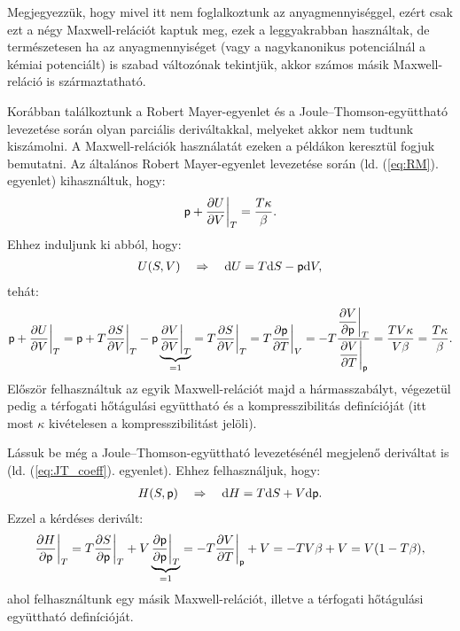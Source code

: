 Megjegyezzük, hogy mivel itt nem foglalkoztunk az anyagmennyiséggel, ezért csak ezt a négy Maxwell-relációt kaptuk meg, ezek a leggyakrabban használtak, de természetesen ha az anyagmennyiséget (vagy a nagykanonikus potenciálnál a kémiai potenciált) is szabad változónak tekintjük, akkor számos másik Maxwell-reláció is származtatható.

Korábban találkoztunk a Robert Mayer-egyenlet és a Joule--Thomson-együttható levezetése során olyan parciális deriváltakkal, melyeket akkor nem tudtunk kiszámolni. A Maxwell-relációk használatát ezeken a példákon keresztül fogjuk bemutatni. Az általános Robert Mayer-egyenlet levezetése során (ld. (\ref{eq:RM}). egyenlet) kihasználtuk, hogy:
\begin{align}
    \mathsf p + \frac{\partial{U}}{\partial{V}}\bigg|_T = \frac{T\kappa}{\beta}.
\end{align}
Ehhez induljunk ki abból, hogy:
\begin{align}
    U(S,V) \quad\Rightarrow\quad \mathrm{d}U=T\mathrm{d}S-\mathsf p\mathrm{d}V,
\end{align}
tehát:
\begin{align}\label{eq:RM_Maxwell}
    \mathsf p + \frac{\partial{U}}{\partial{V}}\bigg|_T = \mathsf p + T\frac{\partial{S}}{\partial{V}}\bigg|_T-\mathsf p\underbrace{\frac{\partial{V}}{\partial{V}}\bigg|_T}_{=1}=T\frac{\partial{S}}{\partial{V}}\bigg|_T=T\frac{\partial{\mathsf p}}{\partial{T}}\bigg|_V = - T \frac{\dfrac{\partial V}{\partial \mathsf p}\bigg|_T}{\dfrac{\partial V}{\partial T}\bigg|_\mathsf p} = \frac{TV\kappa}{V\beta}=\frac{T\kappa}{\beta}.
\end{align}
Először felhasználtuk az egyik Maxwell-relációt majd a hármasszabályt, végezetül pedig a térfogati hőtágulási együttható és a kompresszibilitás definícióját (itt most $\kappa$ kivételesen a kompresszibilitást jelöli).

Lássuk be még a Joule--Thomson-együttható levezetésénél megjelenő deriváltat is (ld. (\ref{eq:JT_coeff}). egyenlet). Ehhez felhasználjuk, hogy:
\begin{align}
    H(S,\mathsf p)\quad\Rightarrow\quad \mathrm{d}H=T\mathrm{d}S+V\mathrm{d}\mathsf p.
\end{align}
Ezzel a kérdéses derivált:
\begin{align}\label{eq:JT_Maxwell}
    \frac{\partial{H}}{\partial{\mathsf p}}\bigg|_T = T\frac{\partial{S}}{\partial{\mathsf p}}\bigg|_T + V\underbrace{\frac{\partial{\mathsf p}}{\partial{\mathsf p}}\bigg|_T}_{=1} = -T\frac{\partial{V}}{\partial{T}}\bigg|_\mathsf p + V= -TV\beta +V = V(1-T\beta),
\end{align}
ahol felhasználtunk egy másik Maxwell-relációt, illetve a térfogati hőtágulási együttható definícióját.

